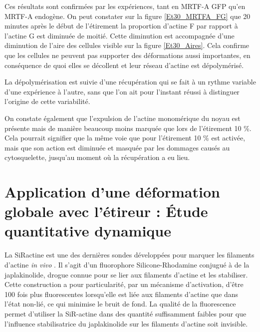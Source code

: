 \documentclass{report}
\begin{document}
Ces résultats sont confirmées par les expériences, tant en MRTF-A GFP qu'en MRTF-A endogène. On peut constater sur la figure \ref{Et30_MRTFA_FG} que 20 minutes après le début de l'étirement la proportion d'actine F par rapport à l'actine G est diminuée de moitié. Cette diminution est accompagnée d'une diminution de l'aire des cellules visible sur la figure \ref{Et30_Aires}. Cela confirme que les cellules ne peuvent pas supporter des déformations aussi importantes, en conséquence de quoi elles se décollent et leur réseau d'actine est dépolymérisé. 

La dépolymérisation est suivie d'une récupération qui se fait à un rythme variable d'une expérience à l'autre, sans que l'on ait pour l'instant réussi à distinguer l'origine de cette variabilité. 

On constate également que l'expulsion de l'actine monomérique du noyau est présente mais de manière beaucoup moins marquée que lors de l'étirement 10 \%. Cela pourrait signifier que la même voie que pour l'étirement 10 \% est activée, mais que son action est diminuée et masquée par les dommages causés au cytosquelette, jusqu'au moment où la récupération a eu lieu. 

\section{Application d'une déformation globale avec l'étireur : \'Etude quantitative dynamique}

La SiRactine est une des dernières sondes développées pour marquer les filaments d'actine \textit{in vivo} \cite{Lukinavicius}. Il s'agit d'un fluorophore Silicone-Rhodamine conjugué à de la japlakinolide, drogue connue pour se lier aux filaments d'actine et les stabiliser. Cette construction a pour particularité, par un mécanisme d'activation, d'être 100 fois plus fluorescentes lorsqu'elle est liée aux filaments d'actine que dans l'état non-lié, ce qui minimise le bruit de fond. La qualité de la fluorescence permet d'utiliser la SiR-actine dans des quantité suffisamment faibles pour que l'influence stabilisatrice du japlakinolide sur les filaments d'actine soit invisible. 
\end{document}
